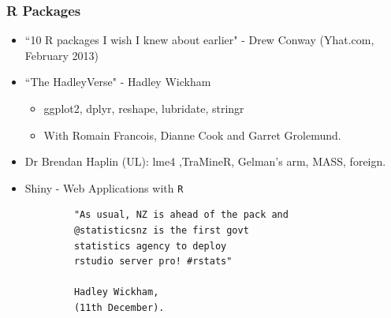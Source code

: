 \documentclass{beamer}
\begin{document}
	\begin{frame}	
		\frametitle{R Packages}
		
		\begin{itemize}
			\item ``10 R packages I wish I knew about earlier" - Drew Conway (Yhat.com, February 2013)
			\bigskip \item ``The HadleyVerse" - Hadley Wickham
			\begin{itemize}
				
				\item  ggplot2, dplyr, reshape, lubridate, stringr
				
				\item  With Romain Francois, Dianne Cook and Garret Grolemund.
			\end{itemize}
			\bigskip
			\item Dr Brendan Haplin (UL): lme4 ,TraMineR, Gelman's arm, MASS, foreign. 
			\bigskip
			\item Shiny - Web Applications with \texttt{R}
		\end{itemize}
	\end{frame}
	
	
	
	
	\begin{frame}[fragile]
		\Large
		\begin{framed}
			\begin{verbatim}
			"As usual, NZ is ahead of the pack and 
			@statisticsnz is the first govt 
			statistics agency to deploy 
			rstudio server pro! #rstats"
			
			Hadley Wickham, 
			(11th December).
			\end{verbatim}
		\end{framed}
		
	\end{frame}
	
	
	
	
\end{document}
